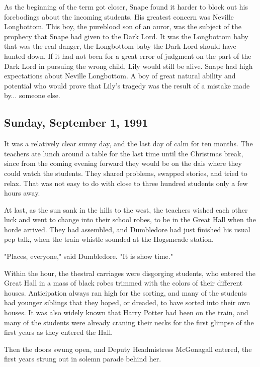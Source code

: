 \documentclass[a4paper,11pt]{article}
\begin{document}
As the beginning of the term got closer, Snape found it harder to block out his forebodings about the incoming students. His greatest concern was Neville Longbottom. This boy, the pureblood son of an auror, was the subject of the prophecy that Snape had given to the Dark Lord. It was the Longbottom baby that was the real danger, the Longbottom baby the Dark Lord should have hunted down. If it had not been for a great error of judgment on the part of the Dark Lord in pursuing the wrong child, Lily would still be alive. Snape had high expectations about Neville Longbottom. A boy of great natural ability and potential who would prove that Lily's tragedy was the result of a mistake made by... someone else.

\subsection{Sunday, September 1, 1991}

It was a relatively clear sunny day, and the last day of calm for ten months. The teachers ate lunch around a table for the last time until the Christmas break, since from the coming evening forward they would be on the dais where they could watch the students. They shared problems, swapped stories, and tried to relax. That was not easy to do with close to three hundred students only a few hours away.

At last, as the sun sank in the hills to the west, the teachers wished each other luck and went to change into their school robes, to be in the Great Hall when the horde arrived. They had assembled, and Dumbledore had just finished his usual pep talk, when the train whistle sounded at the Hogsmeade station.

"Places, everyone," said Dumbledore. "It is show time."

Within the hour, the thestral carriages were disgorging students, who entered the Great Hall in a mass of black robes trimmed with the colors of their different houses. Anticipation always ran high for the sorting, and many of the students had younger siblings that they hoped, or dreaded, to have sorted into their own houses. It was also widely known that Harry Potter had been on the train, and many of the students were already craning their necks for the first glimpse of the first years as they entered the Hall.

Then the doors swung open, and Deputy Headmistress McGonagall entered, the first years strung out in solemn parade behind her.
\end{document}
